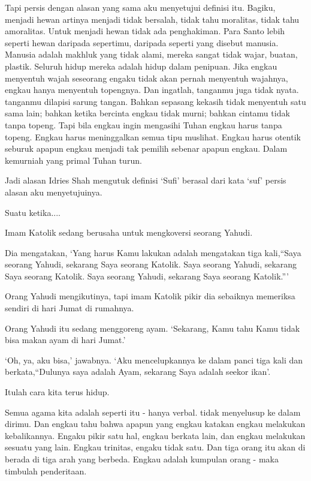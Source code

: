 Tapi persis dengan alasan yang sama aku menyetujui definisi itu. Bagiku, menjadi hewan artinya menjadi tidak bersalah, tidak tahu moralitas, tidak tahu amoralitas. Untuk menjadi hewan tidak ada penghakiman. Para Santo lebih seperti hewan daripada sepertimu, daripada seperti yang disebut manusia. Manusia adalah makhluk yang tidak alami, mereka sangat tidak wajar, buatan, plastik. Seluruh hidup mereka adalah hidup dalam penipuan. Jika engkau menyentuh wajah seseorang engaku tidak akan pernah menyentuh wajahnya, engkau hanya menyentuh topengnya. Dan ingatlah, tanganmu juga tidak nyata. tanganmu dilapisi sarung tangan. Bahkan sepasang kekasih tidak menyentuh satu sama lain; bahkan ketika bercinta engkau tidak murni; bahkan cintamu tidak tanpa topeng. Tapi bila engkau ingin mengasihi Tuhan engkau harus tanpa topeng. Engkau harus meninggalkan semua tipu muslihat. Engkau harus otentik seburuk apapun engkau menjadi tak pemilih sebenar apapun engkau. Dalam kemurniah yang primal Tuhan turun.

Jadi alasan Idries Shah mengutuk definisi ‘Sufi’ berasal dari kata ‘suf’ persis alasan aku menyetujuinya.

Suatu ketika....

Imam Katolik sedang berusaha untuk mengkoversi seorang Yahudi.

Dia mengatakan, ‘Yang harus Kamu lakukan adalah mengatakan tiga kali,“Saya seorang Yahudi, sekarang Saya seorang Katolik. Saya seorang Yahudi, sekarang Saya seorang Katolik. Saya seorang Yahudi, sekarang Saya seorang Katolik.”’

Orang Yahudi mengikutinya, tapi imam Katolik pikir dia sebaiknya memeriksa sendiri di hari Jumat di rumahnya.

Orang Yahudi itu sedang menggoreng ayam. ‘Sekarang, Kamu tahu Kamu tidak bisa makan ayam di hari Jumat.’

‘Oh, ya, aku bisa,’ jawabnya. ‘Aku mencelupkannya ke dalam panci tiga kali dan berkata,“Dulunya saya adalah Ayam, sekarang Saya adalah seekor ikan'.

Itulah cara kita terus hidup.

Semua agama kita adalah seperti itu - hanya verbal. tidak menyelusup ke dalam dirimu. Dan engkau tahu bahwa apapun yang engkau katakan engkau melakukan kebalikannya. Engaku pikir satu hal, engkau berkata lain, dan engkau melakukan sesuatu yang lain. Engkau trinitas, engaku tidak satu. Dan tiga orang itu akan di berada di tiga arah yang berbeda. Engkau adalah kumpulan orang - maka timbulah penderitaan.
